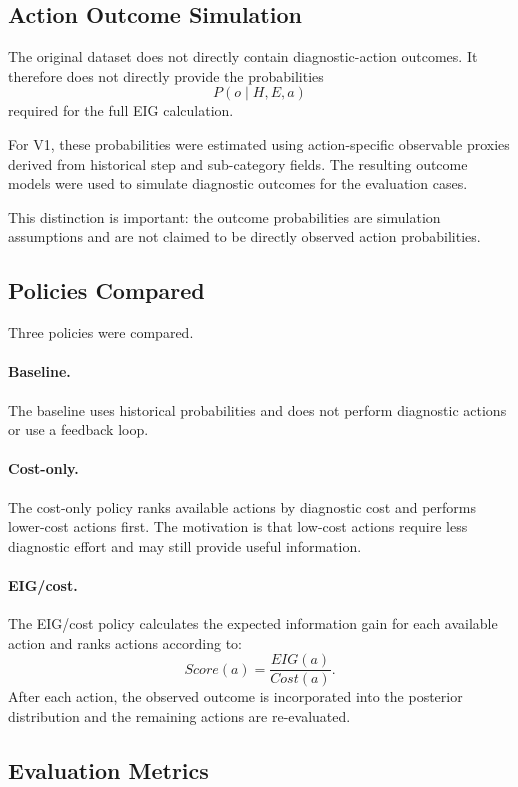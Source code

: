 \documentclass{article}
\begin{document}
\subsection{Action Outcome Simulation}

The original dataset does not directly contain diagnostic-action outcomes. It therefore does not directly provide the probabilities
\[
P(o\mid H,E,a)
\]
required for the full EIG calculation.

For V1, these probabilities were estimated using action-specific observable proxies derived from historical step and sub-category fields. The resulting outcome models were used to simulate diagnostic outcomes for the evaluation cases.

This distinction is important: the outcome probabilities are simulation assumptions and are not claimed to be directly observed action probabilities.

\subsection{Policies Compared}

Three policies were compared.

\paragraph{Baseline.}
The baseline uses historical probabilities and does not perform diagnostic actions or use a feedback loop.

\paragraph{Cost-only.}
The cost-only policy ranks available actions by diagnostic cost and performs lower-cost actions first. The motivation is that low-cost actions require less diagnostic effort and may still provide useful information.

\paragraph{EIG/cost.}
The EIG/cost policy calculates the expected information gain for each available action and ranks actions according to:
\[
Score(a)=\frac{EIG(a)}{Cost(a)}.
\]
After each action, the observed outcome is incorporated into the posterior distribution and the remaining actions are re-evaluated.

\subsection{Evaluation Metrics}
\end{document}
